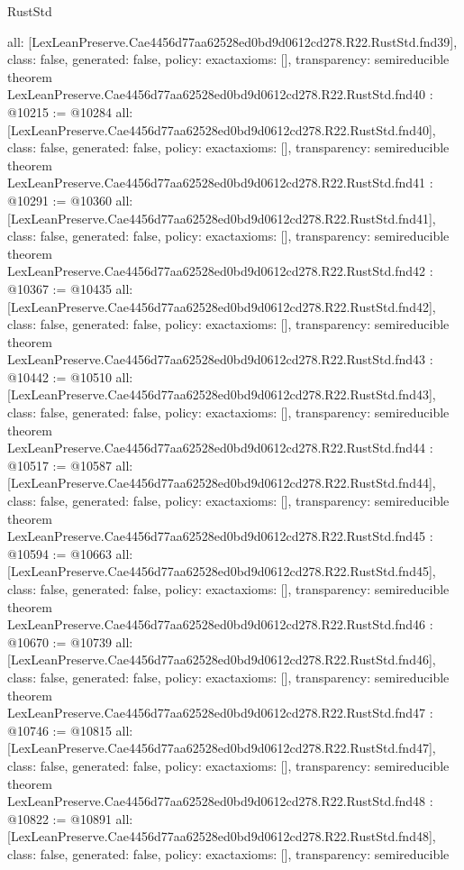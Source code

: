 \begin{lexlean}{RustStd}
\begin{coremodule}
{  all: [LexLeanPreserve.Cae4456d77aa62528ed0bd9d0612cd278.R22.RustStd.fnd39],
  class: false,
  generated: false,
  policy: exact{axioms: []},
  transparency: semireducible
}
theorem LexLeanPreserve.Cae4456d77aa62528ed0bd9d0612cd278.R22.RustStd.fnd40 : @10215 := @10284 {
  all: [LexLeanPreserve.Cae4456d77aa62528ed0bd9d0612cd278.R22.RustStd.fnd40],
  class: false,
  generated: false,
  policy: exact{axioms: []},
  transparency: semireducible
}
theorem LexLeanPreserve.Cae4456d77aa62528ed0bd9d0612cd278.R22.RustStd.fnd41 : @10291 := @10360 {
  all: [LexLeanPreserve.Cae4456d77aa62528ed0bd9d0612cd278.R22.RustStd.fnd41],
  class: false,
  generated: false,
  policy: exact{axioms: []},
  transparency: semireducible
}
theorem LexLeanPreserve.Cae4456d77aa62528ed0bd9d0612cd278.R22.RustStd.fnd42 : @10367 := @10435 {
  all: [LexLeanPreserve.Cae4456d77aa62528ed0bd9d0612cd278.R22.RustStd.fnd42],
  class: false,
  generated: false,
  policy: exact{axioms: []},
  transparency: semireducible
}
theorem LexLeanPreserve.Cae4456d77aa62528ed0bd9d0612cd278.R22.RustStd.fnd43 : @10442 := @10510 {
  all: [LexLeanPreserve.Cae4456d77aa62528ed0bd9d0612cd278.R22.RustStd.fnd43],
  class: false,
  generated: false,
  policy: exact{axioms: []},
  transparency: semireducible
}
theorem LexLeanPreserve.Cae4456d77aa62528ed0bd9d0612cd278.R22.RustStd.fnd44 : @10517 := @10587 {
  all: [LexLeanPreserve.Cae4456d77aa62528ed0bd9d0612cd278.R22.RustStd.fnd44],
  class: false,
  generated: false,
  policy: exact{axioms: []},
  transparency: semireducible
}
theorem LexLeanPreserve.Cae4456d77aa62528ed0bd9d0612cd278.R22.RustStd.fnd45 : @10594 := @10663 {
  all: [LexLeanPreserve.Cae4456d77aa62528ed0bd9d0612cd278.R22.RustStd.fnd45],
  class: false,
  generated: false,
  policy: exact{axioms: []},
  transparency: semireducible
}
theorem LexLeanPreserve.Cae4456d77aa62528ed0bd9d0612cd278.R22.RustStd.fnd46 : @10670 := @10739 {
  all: [LexLeanPreserve.Cae4456d77aa62528ed0bd9d0612cd278.R22.RustStd.fnd46],
  class: false,
  generated: false,
  policy: exact{axioms: []},
  transparency: semireducible
}
theorem LexLeanPreserve.Cae4456d77aa62528ed0bd9d0612cd278.R22.RustStd.fnd47 : @10746 := @10815 {
  all: [LexLeanPreserve.Cae4456d77aa62528ed0bd9d0612cd278.R22.RustStd.fnd47],
  class: false,
  generated: false,
  policy: exact{axioms: []},
  transparency: semireducible
}
theorem LexLeanPreserve.Cae4456d77aa62528ed0bd9d0612cd278.R22.RustStd.fnd48 : @10822 := @10891 {
  all: [LexLeanPreserve.Cae4456d77aa62528ed0bd9d0612cd278.R22.RustStd.fnd48],
  class: false,
  generated: false,
  policy: exact{axioms: []},
  transparency: semireducible
}
\end{coremodule}
\end{lexlean}
